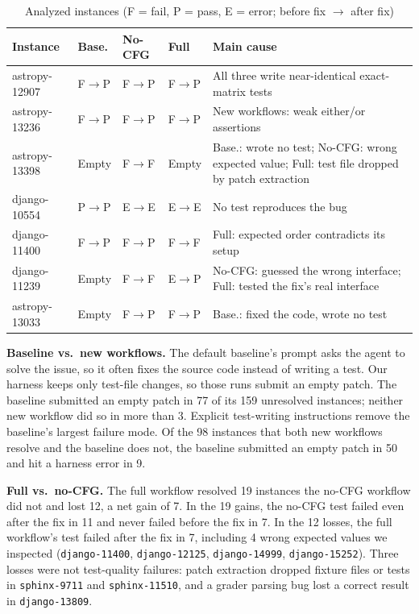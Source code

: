 \documentclass[conference]{IEEEtran}
\begin{document}
\begin{table}[htbp]
\caption{Analyzed instances (F = fail, P = pass, E = error; before fix $\rightarrow$ after fix)}
\label{tab:cases}
\centering
\footnotesize
\begin{tabular}{@{}p{1.45cm}p{0.62cm}p{0.62cm}p{0.62cm}p{3.3cm}@{}}
\toprule
\textbf{Instance} & \textbf{Base.} & \textbf{No-CFG} & \textbf{Full} & \textbf{Main cause} \\
\midrule
astropy-12907 & F$\rightarrow$P & F$\rightarrow$P & F$\rightarrow$P & All three write near-identical exact-matrix tests \\
astropy-13236 & F$\rightarrow$P & F$\rightarrow$P & F$\rightarrow$P & New workflows: weak either/or assertions \\
astropy-13398 & Empty & F$\rightarrow$F & Empty & Base.: wrote no test; No-CFG: wrong expected value; Full: test file dropped by patch extraction \\
django-10554 & P$\rightarrow$P & E$\rightarrow$E & E$\rightarrow$E & No test reproduces the bug \\
django-11400 & F$\rightarrow$P & F$\rightarrow$P & F$\rightarrow$F & Full: expected order contradicts its setup \\
django-11239 & Empty & F$\rightarrow$F & E$\rightarrow$P & No-CFG: guessed the wrong interface; Full: tested the fix's real interface \\
astropy-13033 & Empty & F$\rightarrow$P & F$\rightarrow$P & Base.: fixed the code, wrote no test \\
\bottomrule
\end{tabular}
\end{table}

\textbf{Baseline vs.\ new workflows.} The default baseline's prompt asks the agent to solve the issue, so it often fixes the source code instead of writing a test. Our harness keeps only test-file changes, so those runs submit an empty patch. The baseline submitted an empty patch in 77 of its 159 unresolved instances; neither new workflow did so in more than 3. Explicit test-writing instructions remove the baseline's largest failure mode. Of the 98 instances that both new workflows resolve and the baseline does not, the baseline submitted an empty patch in 50 and hit a harness error in 9.

\textbf{Full vs.\ no-CFG.} The full workflow resolved 19 instances the no-CFG workflow did not and lost 12, a net gain of 7. In the 19 gains, the no-CFG test failed even after the fix in 11 and never failed before the fix in 7. In the 12 losses, the full workflow's test failed after the fix in 7, including 4 wrong expected values we inspected (\texttt{django-11400}, \texttt{django-12125}, \texttt{django-14999}, \texttt{django-15252}). Three losses were not test-quality failures: patch extraction dropped fixture files or tests in \texttt{sphinx-9711} and \texttt{sphinx-11510}, and a grader parsing bug lost a correct result in \texttt{django-13809}.
\end{document}
